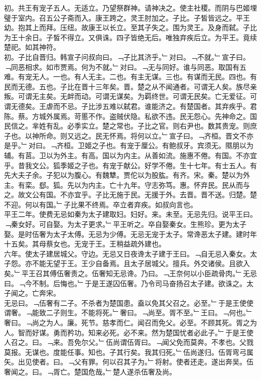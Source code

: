 \documentclass{zhvt-classic}
\begin{document}
\hspace*{2em}初。共王有宠子五人。无适立。乃望祭群神。请神决之。使主社稷。而阴与巴姬埋璧于室内。召五公子斋而入。康王跨之。灵王肘加之。子比。子皙皆远之。平王幼。抱其上而拜。压纽。故康王以长立。至其子失之。围为灵王。及身而弑。子比为王十余日。子皙不得立。又俱诛。四子皆绝无后。唯独弃疾后立。为平王。竟续楚祀。如其神符。\\
\hspace*{2em}初。子比自晋归。韩宣子问叔向曰。﹁子比其济乎。﹂对曰。﹁不就。﹂宣子曰。﹁同恶相求。如市贾焉。何为不就。﹂对曰。﹁无与同好。谁与同恶。取国有五难。有宠无人。一也。有人无主。二也。有主无谋。三也。有谋而无民。四也。有民而无德。五也。子比在晋十三年矣。晋。楚之从不闻通者。可谓无人矣。族尽亲叛。可谓无主矣。无衅而动。可谓无谋矣。为羁终世。可谓无民矣。亡无爱征。可谓无德矣。王虐而不忌。子比涉五难以弑君。谁能济之。有楚国者。其弃疾乎。君陈。蔡。方城外属焉。苛慝不作。盗贼伏隐。私欲不违。民无怨心。先神命之。国民信之。芈姓有乱。必季实立。楚之常也。子比之官。则右尹也。数其贵宠。则庶子也。以神所命。则又远之。民无怀焉。将何以立。﹂宣子曰。﹁齐桓。晋文不亦是乎。﹂对曰。﹁齐桓。卫姬之子也。有宠于厘公。有鲍叔牙。宾须无。隰朋以为辅。有莒。卫以为外主。有高。国以为内主。从善如流。施惠不倦。有国。不亦宜乎。昔我文公。狐季姬之子也。有宠于献公。好学不倦。生十七年。有士五人。有先大夫子余。子犯以为腹心。有魏犨。贾佗以为股肱。有齐。宋。秦。楚以为外主。有栾。郄。狐。先以为内主。亡十九年。守志弥笃。惠。怀弃民。民从而与之。故文公有国。不亦宜乎。子比无施于民。无援于外。去晋。晋不送。归楚。楚不迎。何以有国。﹂子比果不终焉。卒立者弃疾。如叔向言也。\\
\hspace*{2em}平王二年。使费无忌如秦为太子建取妇。妇好。来。未至。无忌先归。说平王曰。﹁秦女好。可自娶。为太子更求。﹂平王听之。卒自娶秦女。生熊珍。更为太子娶。是时伍奢为太子太傅。无忌为少傅。无忌无宠于太子。常谗恶太子建。建时年十五矣。其母蔡女也。无宠于王。王稍益疏外建也。\\
\hspace*{2em}六年。使太子建居城父。守边。无忌又日夜谗太子建于王曰。﹁自无忌入秦女。太子怨。亦不能无望于王。王少自备焉。且太子居城父。擅兵。外交诸侯。且欲入矣。﹂平王召其傅伍奢责之。伍奢知无忌谗。乃曰。﹁王奈何以小臣疏骨肉。﹂无忌曰。﹁今不制。后悔也。﹂于是王遂囚伍奢。乃令司马奋扬召太子建。欲诛之。太子闻之。亡奔宋。\\
\hspace*{2em}无忌曰。﹁伍奢有二子。不杀者为楚国患。盍以免其父召之。必至。﹂于是王使使谓奢。﹁能致二子则生。不能将死。﹂奢曰。﹁尚至。胥不至。﹂王曰。﹁何也。﹂奢曰。﹁尚之为人。廉。死节。慈孝而仁。闻召而免父。必至。不顾其死。胥之为人。智而好谋。勇而矜功。知来必死。必不来。然为楚国忧者必此子。﹂于是王使人召之。曰。﹁来。吾免尔父。﹂伍尚谓伍胥曰。﹁闻父免而莫奔。不孝也。父戮莫报。无谋也。度能任事。知也。子其行矣。我其归死。﹂伍尚遂归。伍胥弯弓属矢。出见使者。曰。﹁父有罪。何以召其子为。﹂将射。使者还走。遂出奔吴。伍奢闻之。曰。﹁胥亡。楚国危哉。﹂楚人遂杀伍奢及尚。\\
\end{document}
